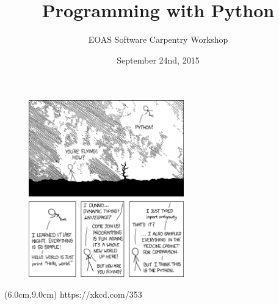 \documentclass{beamer}
\title[Shell Lesson]{Programming with Python}
\subtitle[]{EOAS Software Carpentry Workshop }
\date[Sep 2015]{September 24nd, 2015}
\begin{document}






\begin{frame}[plain]

\titlepage


\end{frame}




\begin{frame}

\begin{figure}[htbp]
   \centering
  \includegraphics[width=0.6\textwidth]{figs_slides/python_xkcd.png}
\end{figure}

\begin{textblock*}{7cm}(6.0cm,9.0cm)
		\centering
			\tiny{https://xkcd.com/353 }
\end{textblock*}



\end{frame}
\end{document}
